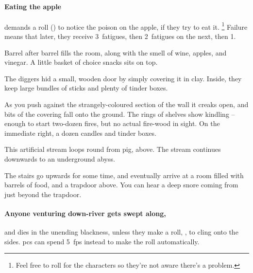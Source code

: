 \paragraph{Eating the apple}
demands a  roll (\tn[11]) to notice the poison on the apple, if they try to eat it.%
\footnote{Feel free to roll for the characters so they're not aware there's a problem.}
Failure means that  later, they receive 3~\glspl{fatigue}, then 2~\glspl{fatigue} on the next, then 1.

\begin{boxtext}
  Barrel after barrel fills the room, along with the smell of wine, apples, and vinegar.
  A little basket of choice snacks sits on top.
\end{boxtext}


The \glspl{digger} hid a small, wooden door by simply covering it in clay.
Inside, they keep large bundles of sticks and plenty of tinder boxes.

\begin{boxtext}
  As you push against the strangely-coloured section of the wall it creaks open, and bits of the covering fall onto the ground.
  The rings of shelves show kindling -- enough to start two-dozen fires, but no actual fire-wood in sight.
  On the immediate right, a dozen candles and tinder boxes.
\end{boxtext}



This artificial stream loops round from \gls{pig}, above.
The stream continues downwards to an underground abyss.

\begin{boxtext}
  The stairs go upwards for some time, and eventually arrive at a room filled with barrels of food, and a trapdoor above.
  You can hear a deep snore coming from just beyond the trapdoor.
\end{boxtext}

\paragraph{Anyone venturing down-river gets swept along,}
and dies in the unending blackness, unless they make a  roll, \tn[10], to cling onto the sides.
\Glspl{pc} can spend 5~\glspl{fp} instead to make the roll automatically.


